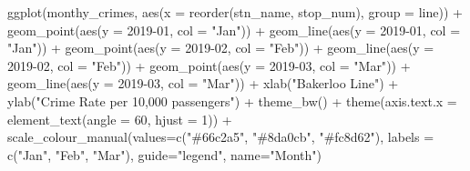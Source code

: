 \documentclass[
  krantz2]{krantz}
\makeatletter
\newenvironment{Shaded}{\begin{snugshade}}{\end{snugshade}}
\newcommand{\AttributeTok}[1]{\textcolor[rgb]{0.61,0.61,0.61}{#1}}
\newcommand{\DecValTok}[1]{\textcolor[rgb]{0.06,0.06,0.06}{#1}}
\newcommand{\FunctionTok}[1]{\textcolor[rgb]{0,0,0}{#1}}
\newcommand{\NormalTok}[1]{#1}
\newcommand{\SpecialCharTok}[1]{\textcolor[rgb]{0,0,0}{#1}}
\newcommand{\StringTok}[1]{\textcolor[rgb]{0.5,0.5,0.5}{#1}}
\newenvironment{kframe}{%
\medskip{}
\setlength{\fboxsep}{.8em}
 \def\at@end@of@kframe{}%
 \ifinner\ifhmode%
  \def\at@end@of@kframe{\end{minipage}}%
  \begin{minipage}{\columnwidth}%
 \fi\fi%
 \def\FrameCommand##1{\hskip\@totalleftmargin \hskip-\fboxsep
 \colorbox{shadecolor}{##1}\hskip-\fboxsep
     \hskip-\linewidth \hskip-\@totalleftmargin \hskip\columnwidth}%
 \MakeFramed {\advance\hsize-\width
   \@totalleftmargin\z@ \linewidth\hsize
   \@setminipage}}%
 {\par\unskip\endMakeFramed%
 \at@end@of@kframe}
\renewenvironment{Shaded}{\begin{kframe}}{\end{kframe}}
\makeatother
\begin{document}
\begin{Shaded}
\begin{Highlighting}[]
\FunctionTok{ggplot}\NormalTok{(monthy\_crimes, }\FunctionTok{aes}\NormalTok{(}\AttributeTok{x =} \FunctionTok{reorder}\NormalTok{(stn\_name, stop\_num), }\AttributeTok{group =}\NormalTok{ line)) }\SpecialCharTok{+} 
  \FunctionTok{geom\_point}\NormalTok{(}\FunctionTok{aes}\NormalTok{(}\AttributeTok{y =} \StringTok{\textasciigrave{}}\AttributeTok{2019{-}01}\StringTok{\textasciigrave{}}\NormalTok{, }\AttributeTok{col =} \StringTok{"Jan"}\NormalTok{)) }\SpecialCharTok{+} 
  \FunctionTok{geom\_line}\NormalTok{(}\FunctionTok{aes}\NormalTok{(}\AttributeTok{y =} \StringTok{\textasciigrave{}}\AttributeTok{2019{-}01}\StringTok{\textasciigrave{}}\NormalTok{, }\AttributeTok{col =} \StringTok{"Jan"}\NormalTok{)) }\SpecialCharTok{+} 
  \FunctionTok{geom\_point}\NormalTok{(}\FunctionTok{aes}\NormalTok{(}\AttributeTok{y =} \StringTok{\textasciigrave{}}\AttributeTok{2019{-}02}\StringTok{\textasciigrave{}}\NormalTok{, }\AttributeTok{col =} \StringTok{"Feb"}\NormalTok{)) }\SpecialCharTok{+} 
  \FunctionTok{geom\_line}\NormalTok{(}\FunctionTok{aes}\NormalTok{(}\AttributeTok{y =} \StringTok{\textasciigrave{}}\AttributeTok{2019{-}02}\StringTok{\textasciigrave{}}\NormalTok{, }\AttributeTok{col =} \StringTok{"Feb"}\NormalTok{)) }\SpecialCharTok{+}
  \FunctionTok{geom\_point}\NormalTok{(}\FunctionTok{aes}\NormalTok{(}\AttributeTok{y =} \StringTok{\textasciigrave{}}\AttributeTok{2019{-}03}\StringTok{\textasciigrave{}}\NormalTok{, }\AttributeTok{col =} \StringTok{"Mar"}\NormalTok{)) }\SpecialCharTok{+} 
  \FunctionTok{geom\_line}\NormalTok{(}\FunctionTok{aes}\NormalTok{(}\AttributeTok{y =} \StringTok{\textasciigrave{}}\AttributeTok{2019{-}03}\StringTok{\textasciigrave{}}\NormalTok{, }\AttributeTok{col =} \StringTok{"Mar"}\NormalTok{)) }\SpecialCharTok{+}
  \FunctionTok{xlab}\NormalTok{(}\StringTok{"Bakerloo Line"}\NormalTok{) }\SpecialCharTok{+} 
  \FunctionTok{ylab}\NormalTok{(}\StringTok{"Crime Rate per 10,000 passengers"}\NormalTok{) }\SpecialCharTok{+} 
  \FunctionTok{theme\_bw}\NormalTok{() }\SpecialCharTok{+} 
  \FunctionTok{theme}\NormalTok{(}\AttributeTok{axis.text.x =} \FunctionTok{element\_text}\NormalTok{(}\AttributeTok{angle =} \DecValTok{60}\NormalTok{, }\AttributeTok{hjust =} \DecValTok{1}\NormalTok{)) }\SpecialCharTok{+} 
  \FunctionTok{scale\_colour\_manual}\NormalTok{(}\AttributeTok{values=}\FunctionTok{c}\NormalTok{(}\StringTok{"\#66c2a5"}\NormalTok{, }\StringTok{"\#8da0cb"}\NormalTok{, }\StringTok{"\#fc8d62"}\NormalTok{), }
                      \AttributeTok{labels =} \FunctionTok{c}\NormalTok{(}\StringTok{"Jan"}\NormalTok{, }\StringTok{"Feb"}\NormalTok{, }\StringTok{"Mar"}\NormalTok{), }
                      \AttributeTok{guide=}\StringTok{"legend"}\NormalTok{, }\AttributeTok{name=}\StringTok{"Month"}\NormalTok{)}
\end{Highlighting}
\end{Shaded}
\end{document}
